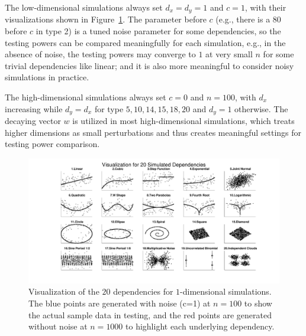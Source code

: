 \documentclass[11pt]{article}
\begin{document}
The low-dimensional simulations always set $d_{x}=d_{y}=1$ and $c=1$, with their visualizations shown in Figure~\ref{f:dependencies}. The parameter before $c$ (e.g., there is a $80$ before $c$ in type 2) is a tuned noise parameter for some dependencies, so the testing powers can be compared meaningfully for each simulation, e.g., in the absence of noise, the testing powers may converge to $1$ at very small $n$ for some trivial dependencies like linear; and it is also more meaningful to consider noisy simulations in practice. 

The high-dimensional simulations always set $c=0$ and $n=100$, with $d_{x}$ increasing while $d_{y}=d_{x}$ for type $5,10,14,15,18,20$ and $d_{y}=1$ otherwise. The decaying vector $w$ is utilized in most high-dimensional simulations, which treats higher dimensions as small perturbations and thus creates meaningful settings for testing power comparison. %

\begin{figure}[htbp]
\includegraphics[trim={5cm 0 3.5cm 0},clip, width=1.0\textwidth]{Figures/FigSimVisual}
\caption{Visualization of the $20$ dependencies for $1$-dimensional simulations. The blue points are generated with noise (c=1) at $n=100$ to show the actual sample data in testing, and the red points are generated without noise at $n=1000$ to highlight each underlying dependency.
}
\label{f:dependencies}
\end{figure}
\end{document}
